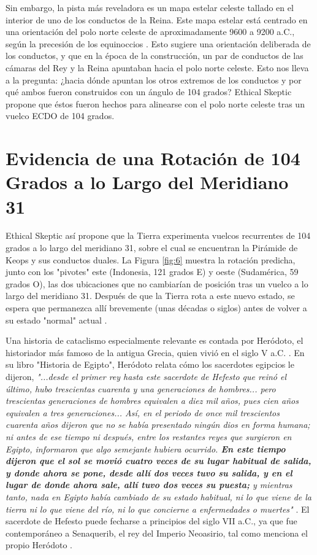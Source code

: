 \documentclass[10pt,twocolumn,letterpaper]{article}
\begin{document}
Sin embargo, la pista más reveladora es un mapa estelar celeste tallado en el interior de uno de los conductos de la Reina. Este mapa estelar está centrado en una orientación del polo norte celeste de aproximadamente 9600 a 9200 a.C., según la precesión de los equinoccios \cite{28}. Esto sugiere una orientación deliberada de los conductos, y que en la época de la construcción, un par de conductos de las cámaras del Rey y la Reina apuntaban hacia el polo norte celeste. Esto nos lleva a la pregunta: ¿hacia dónde apuntan los otros extremos de los conductos y por qué ambos fueron construidos con un ángulo de 104 grados? Ethical Skeptic propone que éstos fueron hechos para alinearse con el polo norte celeste tras un vuelco ECDO de 104 grados.

\section{Evidencia de una Rotación de 104 Grados a lo Largo del Meridiano 31}

Ethical Skeptic así propone que la Tierra experimenta vuelcos recurrentes de 104 grados a lo largo del meridiano 31, sobre el cual se encuentran la Pirámide de Keops y sus conductos duales. La Figura \ref{fig:6} muestra la rotación predicha, junto con los "pivotes" este (Indonesia, 121 grados E) y oeste (Sudamérica, 59 grados O), las dos ubicaciones que no cambiarían de posición tras un vuelco a lo largo del meridiano 31. Después de que la Tierra rota a este nuevo estado, se espera que permanezca allí brevemente (unas décadas o siglos) antes de volver a su estado "normal" actual \cite{150}.

Una historia de cataclismo especialmente relevante es contada por Heródoto, el historiador más famoso de la antigua Grecia, quien vivió en el siglo V a.C. \cite{31}. En su libro "Historia de Egipto", Heródoto relata cómo los sacerdotes egipcios le dijeron, \textit{"...desde el primer rey hasta este sacerdote de Hefesto que reinó el último, hubo trescientas cuarenta y una generaciones de hombres... pero trescientas generaciones de hombres equivalen a diez mil años, pues cien años equivalen a tres generaciones... Así, en el periodo de once mil trescientos cuarenta años dijeron que no se había presentado ningún dios en forma humana; ni antes de ese tiempo ni después, entre los restantes reyes que surgieron en Egipto, informaron que algo semejante hubiera ocurrido. \textbf{En este tiempo dijeron que el sol se movió cuatro veces de su lugar habitual de salida, y donde ahora se pone, desde allí dos veces tuvo su salida, y en el lugar de donde ahora sale, allí tuvo dos veces su puesta;} y mientras tanto, nada en Egipto había cambiado de su estado habitual, ni lo que viene de la tierra ni lo que viene del río, ni lo que concierne a enfermedades o muertes"} \cite{32}. El sacerdote de Hefesto puede fecharse a principios del siglo VII a.C., ya que fue contemporáneo a Senaquerib, el rey del Imperio Neoasirio, tal como menciona el propio Heródoto \cite{32,33,34}.
\end{document}
